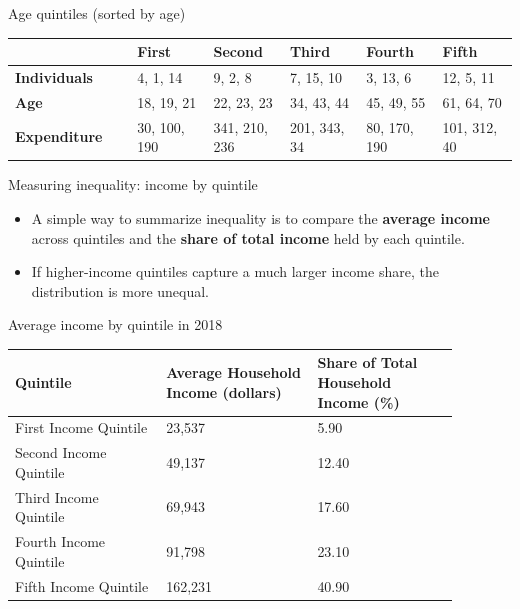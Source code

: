 \documentclass[aspectratio=169]{beamer}
\begin{document}
\begin{frame}{Age quintiles (sorted by age)}
\transfade
\begin{center}
\scriptsize
\setlength{\tabcolsep}{2pt}
\renewcommand{\arraystretch}{1.1}
\begin{tabular}{p{0.24\linewidth} p{0.152\linewidth} p{0.152\linewidth} p{0.152\linewidth} p{0.152\linewidth} p{0.152\linewidth}}
\toprule
& \textbf{First} & \textbf{Second} & \textbf{Third} & \textbf{Fourth} & \textbf{Fifth} \\
\midrule
\textbf{Individuals} & 4, 1, 14 & 9, 2, 8 & 7, 15, 10 & 3, 13, 6 & 12, 5, 11 \\
\textbf{Age} & 18, 19, 21 & 22, 23, 23 & 34, 43, 44 & 45, 49, 55 & 61, 64, 70 \\
\textbf{Expenditure} & 30, 100, 190 & 341, 210, 236 & 201, 343, 34 & 80, 170, 190 & 101, 312, 40 \\
\bottomrule
\end{tabular}
\end{center}
\end{frame}

\begin{frame}{Measuring inequality: income by quintile}
\transfade
\begin{itemize}[<+->]
\item A simple way to summarize inequality is to compare the \textbf{average income} across quintiles and the \textbf{share of total income} held by each quintile.
\item If higher-income quintiles capture a much larger income share, the distribution is more unequal.
\end{itemize}
\end{frame}

\begin{frame}{Average income by quintile in 2018}
\transfade
\begin{center}
\small
\begin{tabular}{p{0.3\linewidth} p{0.30\linewidth} p{0.28\linewidth}}
\toprule
\textbf{Quintile} & \textbf{Average Household Income (dollars)} & \textbf{Share of Total Household Income (\%)} \\
\midrule
First Income Quintile & 23{,}537 & 5.90 \\
Second Income Quintile & 49{,}137 & 12.40 \\
Third Income Quintile & 69{,}943 & 17.60 \\
Fourth Income Quintile & 91{,}798 & 23.10 \\
Fifth Income Quintile & 162{,}231 & 40.90 \\
\bottomrule
\end{tabular}
\end{center}
\end{frame}
\end{document}
